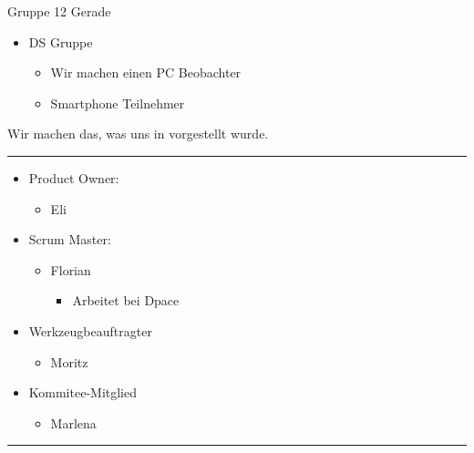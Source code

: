 Gruppe 12 Gerade

\begin{itemize}
\tightlist
\item
  DS Gruppe

  \begin{itemize}
  \tightlist
  \item
    Wir machen einen PC Beobachter
  \item
    Smartphone Teilnehmer
  \end{itemize}
\end{itemize}

Wir machen das, was uns in vorgestellt wurde.

\begin{center}\rule{0.5\linewidth}{0.5pt}\end{center}

\begin{itemize}
\tightlist
\item
  Product Owner:

  \begin{itemize}
  \tightlist
  \item
    Eli
  \end{itemize}
\item
  Scrum Master:

  \begin{itemize}
  \tightlist
  \item
    Florian

    \begin{itemize}
    \tightlist
    \item
      Arbeitet bei Dpace
    \end{itemize}
  \end{itemize}
\item
  Werkzeugbeauftragter

  \begin{itemize}
  \tightlist
  \item
    Moritz
  \end{itemize}
\item
  Kommitee-Mitglied

  \begin{itemize}
  \tightlist
  \item
    Marlena
  \end{itemize}
\end{itemize}

\begin{center}\rule{0.5\linewidth}{0.5pt}\end{center}

